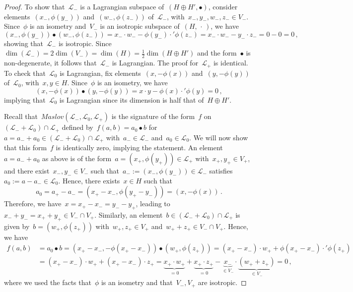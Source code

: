 \documentclass{amsart}
\theoremstyle{definition}
\theoremstyle{remark}
\begin{document}
	\begin{proof}
		To show that~$\mathcal{L}_-$ is a Lagrangian subspace of~$(H\oplus H',\bullet)$, consider
		elements~$(x_-,\phi(y_-))$ and~$(w_-,\phi(z_-))$ of~$\mathcal{L}_-$, with~$x_-,y_-,w_-,z_-\in V_-$. Since~$\phi$ is
		an isometry and~$V_-$ is an isotropic subspace of~$(H,\,\cdot\,)$, we have
		\[
		(x_-,\phi(y_-))\bullet (w_-,\phi(z_-))=x_-\cdot w_--\phi(y_-)\cdot'\phi(z_-)=x_-\cdot w_--y_-\cdot z_-=0-0=0\,,
		\]
		showing that~$\mathcal{L}_-$ is isotropic. Since~$\dim(\mathcal{L}_-)=2\dim(V_-)=\dim(H)=\frac{1}{2}\dim(H\oplus H')$
		and the form~$\bullet$ is non-degenerate, it follows that~$\mathcal{L}_-$ is Lagrangian. The proof for~$\mathcal{L}_+$ is identical. To check that~$\mathcal{L}_0$ is Lagrangian, fix elements~$(x,-\phi(x))$ and~$(y,-\phi(y))$ of~$\mathcal{L}_0$, with~$x,y\in H$. Since~$\phi$ is an isometry, we have
		\[
		(x,-\phi(x))\bullet (y,-\phi(y))=x\cdot y-\phi(x)\cdot'\phi(y)=0\,,
		\]
		implying that~$\mathcal{L}_0$ is Lagrangian since its dimension is half that of~$H\oplus H'$.
		
		Recall that~$\mathit{Maslov}(\mathcal{L}_-,\mathcal{L}_0,\mathcal{L}_+)$ is the signature of the
		form~$f$ on~$(\mathcal{L}_-+\mathcal{L}_0)\cap\mathcal{L}_+$ defined by~$f(a,b)=a_0\bullet b$ for~$a=a_-+a_0\in(\mathcal{L}_-+\mathcal{L}_0)\cap\mathcal{L}_+$ with~$a_-\in\mathcal{L}_-$ and~$a_0\in\mathcal{L}_0$.
		We will now show that this form~$f$ is identically zero, implying the statement. An element~$a=a_-+a_0$ as above is of the form~$a=(x_+,\phi(y_+))\in\mathcal{L}_+$ with~$x_+,y_+\in V_+$, and there exist~$x_-,y_-\in V_-$ such that~$a_-:=(x_-,\phi(y_-))\in\mathcal{L}_-$ satisfies~$a_0:=a-a_-\in\mathcal{L}_0$. Hence, there exists~$x\in H$ such that
		\[
		a_0=a_+-a_-=(x_+-x_-,\phi(y_+-y_-))=(x,-\phi(x))\,.
		\]
		Therefore, we have~$x=x_+-x_-=y_--y_+$, leading to~$x_-+y_-=x_++y_+\in V_-\cap V_+$.
		Similarly, an element~$b\in(\mathcal{L}_-+\mathcal{L}_0)\cap\mathcal{L}_+$ is given by~$b=(w_+,\phi(z_+))$ with~$w_+,z_+\in V_+$ and~$w_++z_+\in V_-\cap V_+$. Hence, we have
		\begin{align*}
			f(a,b)&=a_0\bullet b=(x_+-x_-,-\phi(x_+-x_-))\bullet (w_+,\phi(z_+))=(x_+-x_-)\cdot w_++\phi(x_+-x_-)\cdot'\phi(z_+)\\
			&=(x_+-x_-)\cdot w_++(x_+-x_-)\cdot z_+=\underbrace{x_+\cdot w_+}_{=0}+\underbrace{x_+\cdot z_+}_{=0}-\underbrace{x_-}_{\in V_-}\cdot \underbrace{(w_++z_+)}_{\in V_-}=0\,,
		\end{align*}
		where we used the facts that~$\phi$ is an isometry and that~$V_-,V_+$ are isotropic.
	\end{proof}	
	
\end{document}
